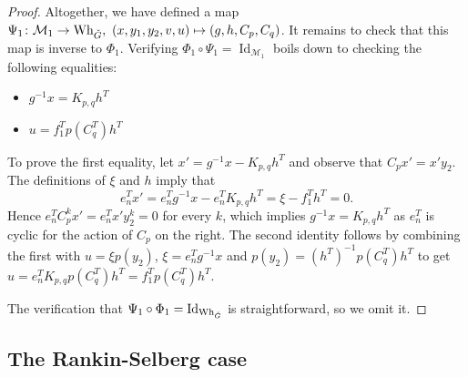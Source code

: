 \documentclass[11pt]{article}
\theoremstyle{definition}
\theoremstyle{plain}
\theoremstyle{remark}
\DeclareMathOperator{\id}{Id}
\begin{document}
\begin{proof}
            Altogether, we have defined a map $\Psi_1\colon \mathcal{M}_1 \to \mathrm{Wh}_{\Check{G}},\ (x,y_1,y_2,v,u) \mapsto (g,h,C_p,C_q)$. It remains to check that this map is inverse to $\Phi_1$. Verifying $\Phi_1 \circ \Psi_1 = \id_{\mathcal{M}_1}$ boils down to checking the following equalities:
            \begin{itemize}
                \item $g^{-1}x = K_{p,q}h^T$
                \item $u = f_1^Tp(C_q^T)h^T$
            \end{itemize}
            To prove the first equality, let $x' = g^{-1}x - K_{p,q}h^T$ and observe that $C_px'=x'y_2$. The definitions of $\xi$ and $h$ imply that
            \[
                e_n^Tx'=e_n^Tg^{-1}x-e_n^TK_{p,q}h^T = \xi - f_1^Th^T = 0.
            \]
            Hence $e_n^TC_p^kx'=e_n^Tx'y_2^k=0$ for every $k$, which implies $g^{-1}x=K_{p,q}h^T$ as $e_n^T$ is cyclic for the action of $C_p$ on the right. The second identity follows by combining the first with $u = \xi p(y_2)$, $\xi = e_n^Tg^{-1}x$ and $p(y_2) = (h^T)^{-1}p(C_q^T)h^T$ to get $u=e_n^TK_{p,q}p(C_q^T)h^T = f_1^Tp(C_q^T)h^T$.

            The verification that $\Psi_1 \circ \Phi_1 = \id_{{\mathrm{Wh}}_{\Check{G}}}$ is straightforward, so we omit it.
        \end{proof}

    
        \subsection{The Rankin-Selberg case}
\end{document}
